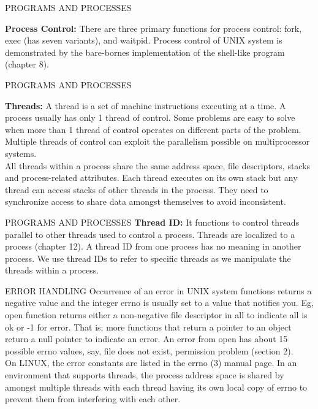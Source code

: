 \documentclass{beamer}
\begin{document}
\begin{frame}[t]{PROGRAMS AND PROCESSES}

\textbf{Process Control:}  There are three primary functions for process control: fork, exec (has seven variants), and waitpid. Process control of UNIX system is demonstrated by the bare-bornes implementation of the shell-like program (chapter 8). 

\end{frame}

\begin{frame}[t]{PROGRAMS AND PROCESSES}
\subtitle{Threads and Threads ID}
\textbf{Threads:} A thread is a set of machine instructions executing at a time. A process usually has only 1 thread of control. Some problems are easy to solve when more than 1 thread of control operates on different parts of the problem. Multiple threads of control can exploit the parallelism possible on multiprocessor systems.
\\[6pt]All threads within a process share the same address space, file descriptors, stacks and process-related attributes. Each thread executes on its own stack but any thread can access stacks of other threads in the process. They need to synchronize access to share data amongst themselves to avoid inconsistent.

\end{frame}
\begin{frame}[t]{PROGRAMS AND PROCESSES}
\textbf{Thread ID:} It functions to control threads parallel to other threads used to control a process. Threads are localized to a process (chapter 12). A thread ID from one process has no meaning in another process. We use thread IDs to refer to specific threads as we manipulate the threads within a process.

\end{frame}

\begin{frame}[t]{ERROR HANDLING}
Occurrence of an error in UNIX system functions returns a negative value and the integer errno is usually set to a value that notifies you. Eg, open function returns either a non-negative file descriptor in all to indicate all is ok or -1 for error. That is; more functions that return a pointer to an object return a null pointer to indicate an error. An error from open has about 15 possible errno values, say, file does not exist, permission problem (section 2).
\\[6pt]On LINUX, the error constants are listed in the errno (3) manual page. In an environment that supports threads, the process address space is shared by amongst multiple threads with each thread having its own local copy of errno to prevent them from interfering with each other. 


\end{frame}
\end{document}
